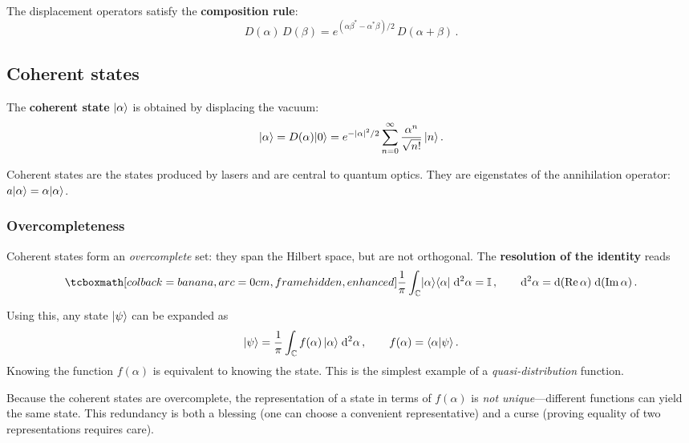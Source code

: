 The displacement operators satisfy the \textbf{composition rule}:
\begin{equation}\label{eq:displacement-compose}
  D(\alpha)\,D(\beta)
  = e^{(\alpha\beta^* - \alpha^*\beta)/2}\,D(\alpha + \beta)\,.
\end{equation}

\subsection{Coherent states}\label{sec:coherent-states}

\begin{definition}\label{def:coherent-state}
  The \textbf{coherent state} $\lvert \alpha \rangle$ is obtained by displacing
  the vacuum:
  \begin{equation}\label{eq:coherent-state}
    \lvert \alpha \rangle = D(\alpha)\lvert 0 \rangle
    = e^{-\lvert\alpha\rvert^2/2}
      \sum_{n=0}^{\infty} \frac{\alpha^n}{\sqrt{n!}}\,\lvert n \rangle\,.
  \end{equation}
\end{definition}

Coherent states are the states produced by lasers and are central to
quantum optics.  They are eigenstates of the annihilation operator:
$a\lvert \alpha \rangle = \alpha\lvert \alpha \rangle$.

\subsubsection{Overcompleteness}

Coherent states form an \emph{overcomplete} set: they span the Hilbert
space, but are not orthogonal.  The \textbf{resolution of the identity}
reads
\begin{equation}\label{eq:coherent-completeness}
  \eqbox{\frac{1}{\pi}\int_{\C}
    \ketbra{\alpha}{\alpha}\;\dd^2\alpha = \One}\,,
  \qquad \dd^2\alpha = \dd(\mathrm{Re}\,\alpha)\;\dd(\mathrm{Im}\,\alpha)\,.
\end{equation}

Using this, any state $\lvert \psi \rangle$ can be expanded as
\[
  \lvert \psi \rangle
  = \frac{1}{\pi}\int_{\mathbb{C}} f(\alpha)\,\lvert \alpha \rangle\;\mathrm{d}^2\alpha\,,
  \qquad f(\alpha) = \langle \alpha | \psi \rangle\,.
\]
Knowing the function $f(\alpha)$ is equivalent to knowing the state.
This is the simplest example of a \emph{quasi-distribution} function.

\begin{remark}
  Because the coherent states are overcomplete, the representation of
  a state in terms of $f(\alpha)$ is \emph{not unique}---different
  functions can yield the same state.  This redundancy is both a
  blessing (one can choose a convenient representative) and a curse
  (proving equality of two representations requires care).
\end{remark}

